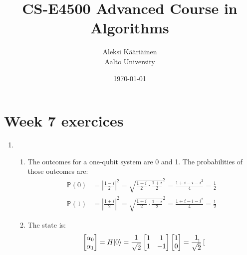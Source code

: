 \documentclass[11pt,a4paper]{article}
\title{CS-E4500 Advanced Course in Algorithms}
\author{Aleksi Kääriäinen  \\
	Aalto University  \\
	}
\begin{document}
\date{\today}

\maketitle

\newpage

\section*{Week 7 exercices}

\begin{enumerate}
    \item
          \begin{enumerate}
              \item The outcomes for a one-qubit system are 0 and 1. The probabilities of those outcomes are:
                    \begin{align*}
                        \mathbb{P}(0) & = \left | \frac{1 - i}{2} \right |^2 = \sqrt{\frac{1 - i}{2}\cdot \frac{1 + i}{2}}^2
                        = \frac{1 + i - i - i^2}{4} = \frac{1}{2}                                                            \\
                        \mathbb{P}(1) & = \left | \frac{1 + i}{2} \right |^2 = \sqrt{\frac{1 + i}{2}\cdot \frac{1 - i}{2}}^2
                        = \frac{1 + i - i - i^2}{4} = \frac{1}{2}
                    \end{align*}
              \item The state is:
                    \begin{align*}
                        \begin{bmatrix}
                            \alpha_0 \\ \alpha_1
                        \end{bmatrix} = H|0\rangle = \frac{1}{\sqrt{2}}\begin{bmatrix}
                                                                        1 & 1 \\ 1 & -1
                                                                    \end{bmatrix} \begin{bmatrix}
                                                                                      1 \\ 0
                                                                                  \end{bmatrix} = \frac{1}{\sqrt{2}} \begin{bmatrix}

\end{bmatrix}
\end{align*}
\end{enumerate}
\end{enumerate}
\end{document}
